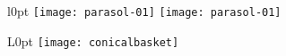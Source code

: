 \begin{texexample}{}{}
\begin{wrapfigure}{l}{0pt}
    \texttt{[image: parasol-01]}
    \texttt{[image: parasol-01]}
 \end{wrapfigure}

\lipsum[1-3]\lorem
\end{texexample}




\begin{texexample}{}{}
\begin{wrapfigure}[13]{L}{0pt}
    \texttt{[image: conicalbasket]}
\end{wrapfigure}

\onepar\onepar\onepar

\end{texexample}



